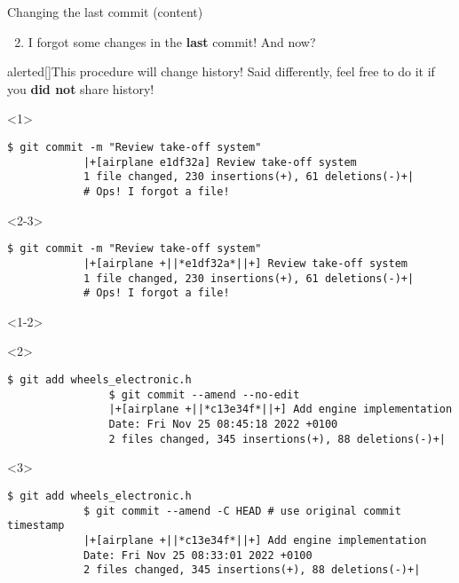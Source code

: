 \documentclass[usenames,svgnames,14pt]{beamer}
\begin{document}
\begin{frame}[fragile]{Changing the last commit (content)}
    \begin{enumerate}
        \setcounter{enumi}{1}
        \item I forgot some changes in the \textbf{last} commit! And now?
    \end{enumerate}
    \begin{varblock}{alerted}[\textwidth]{This procedure will change history!}
        Said differently, feel free to do it if you \alert{\textbf{did not}} share history!
    \end{varblock}
    \vspace{3mm}
    \begin{onlyenv}<1>
        \begin{lstlisting}[style=MyBash]
            $ git commit -m "Review take-off system"
            |+[airplane e1df32a] Review take-off system
            1 file changed, 230 insertions(+), 61 deletions(-)+|
            # Ops! I forgot a file!
        \end{lstlisting}
    \end{onlyenv}
    \begin{onlyenv}<2-3>
        \begin{lstlisting}[style=MyBash]
            $ git commit -m "Review take-off system"
            |+[airplane +||*e1df32a*||+] Review take-off system
            1 file changed, 230 insertions(+), 61 deletions(-)+|
            # Ops! I forgot a file!
        \end{lstlisting}
    \end{onlyenv}
    \begin{onlyenv}<1-2>
        \begin{uncoverenv}<2>
            \begin{lstlisting}[style=MyBash]
                $ git add wheels_electronic.h
                $ git commit --amend --no-edit
                |+[airplane +||*c13e34f*||+] Add engine implementation
                Date: Fri Nov 25 08:45:18 2022 +0100
                2 files changed, 345 insertions(+), 88 deletions(-)+|
            \end{lstlisting}
        \end{uncoverenv}
    \end{onlyenv}
    \begin{onlyenv}<3>
    \begin{lstlisting}[style=MyBash]
            $ git add wheels_electronic.h
            $ git commit --amend -C HEAD # use original commit timestamp
            |+[airplane +||*c13e34f*||+] Add engine implementation
            Date: Fri Nov 25 08:33:01 2022 +0100
            2 files changed, 345 insertions(+), 88 deletions(-)+|
        \end{lstlisting}
    \end{onlyenv}
\end{frame}
\end{document}
